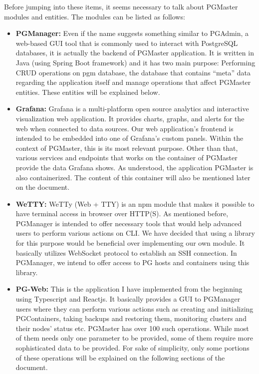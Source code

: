 Before jumping into these items, it seems necessary to talk about PGMaster 
modules and entities. The modules can be listed as follows:

\begin{itemize}
    \item \textbf{PGManager:} Even if the name suggests something similar to 
    PGAdmin, a web-based GUI tool that is commonly used to interact with 
    PostgreSQL databases, it is actually the backend of PGMaster application. 
    It is written in Java (using Spring Boot framework) and it has two main 
    purpose: Performing CRUD operations on pgm database, the database that 
    contains ``meta'' data regarding the application itself and manage 
    operations that affect PGMaster entities. These entities will be 
    explained below.
    \item \textbf{Grafana:} Grafana is a multi-platform open source analytics 
    and interactive visualization web application. It provides charts, 
    graphs, and alerts for the web when connected to data sources. Our 
    web application's frontend is intended to be embedded into one of 
    Grafana's custom panels. Within the context of PGMaster, this is its 
    most relevant purpose. Other than that, various services and endpoints 
    that works on the container of PGMaster provide the data Grafana shows. 
    As understood, the application PGMaster is also containerized. The 
    content of this container will also be mentioned later on the document.
    \item \textbf{WeTTY:} WeTTy (Web + TTY) is an npm module that makes it 
    possible to have terminal access in browser over HTTP(S). As mentioned 
    before, PGManager is intended to offer necessary tools that would help 
    advanced users to perform various actions on CLI. We have decided that 
    using a library for this purpose would be beneficial over implementing 
    our own module. It basically utilizes WebSocket protocol to establish 
    an SSH connection. In PGManager, we intend to offer access to PG hosts 
    and containers using this library.
    \item \textbf{PG-Web:} This is the application I have implemented from 
    the beginning using Typescript and Reactjs. It basically provides a 
    GUI to PGManager users where they can perform various actions such as 
    creating and initializing PGContainers, taking backups and restoring 
    them, monitoring clusters and their nodes' status etc. PGMaster has 
    over 100 such operations. While most of them needs only one parameter 
    to be provided, some of them require more sophisticated data to be 
    provided. For sake of simplicity, only some portions of these operations 
    will be explained on the following sections of the document.
\end{itemize}

